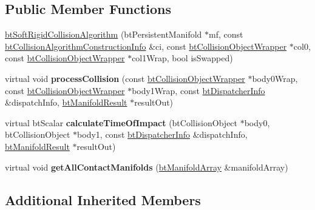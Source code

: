 \subsection*{Public Member Functions}
\begin{DoxyCompactItemize}
\item 
\hyperlink{classbt_soft_rigid_collision_algorithm_aa6f289e315d626acf0a47ba093f6d4eb}{bt\+Soft\+Rigid\+Collision\+Algorithm} (bt\+Persistent\+Manifold $\ast$mf, const \hyperlink{structbt_collision_algorithm_construction_info}{bt\+Collision\+Algorithm\+Construction\+Info} \&ci, const \hyperlink{structbt_collision_object_wrapper}{bt\+Collision\+Object\+Wrapper} $\ast$col0, const \hyperlink{structbt_collision_object_wrapper}{bt\+Collision\+Object\+Wrapper} $\ast$col1\+Wrap, bool is\+Swapped)
\item 
\hypertarget{classbt_soft_rigid_collision_algorithm_ae2a70ed305793bc69865ca0ae21d4b31}{virtual void {\bfseries process\+Collision} (const \hyperlink{structbt_collision_object_wrapper}{bt\+Collision\+Object\+Wrapper} $\ast$body0\+Wrap, const \hyperlink{structbt_collision_object_wrapper}{bt\+Collision\+Object\+Wrapper} $\ast$body1\+Wrap, const \hyperlink{structbt_dispatcher_info}{bt\+Dispatcher\+Info} \&dispatch\+Info, \hyperlink{classbt_manifold_result}{bt\+Manifold\+Result} $\ast$result\+Out)}\label{classbt_soft_rigid_collision_algorithm_ae2a70ed305793bc69865ca0ae21d4b31}

\item 
\hypertarget{classbt_soft_rigid_collision_algorithm_a81633f06daef836f73903d787ee71b67}{virtual bt\+Scalar {\bfseries calculate\+Time\+Of\+Impact} (bt\+Collision\+Object $\ast$body0, bt\+Collision\+Object $\ast$body1, const \hyperlink{structbt_dispatcher_info}{bt\+Dispatcher\+Info} \&dispatch\+Info, \hyperlink{classbt_manifold_result}{bt\+Manifold\+Result} $\ast$result\+Out)}\label{classbt_soft_rigid_collision_algorithm_a81633f06daef836f73903d787ee71b67}

\item 
\hypertarget{classbt_soft_rigid_collision_algorithm_a09c0bea1a9c7ee41ac9f67287f581f89}{virtual void {\bfseries get\+All\+Contact\+Manifolds} (\hyperlink{classbt_aligned_object_array}{bt\+Manifold\+Array} \&manifold\+Array)}\label{classbt_soft_rigid_collision_algorithm_a09c0bea1a9c7ee41ac9f67287f581f89}

\end{DoxyCompactItemize}
\subsection*{Additional Inherited Members}


